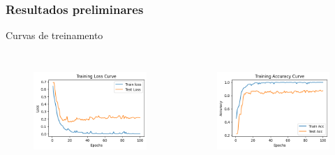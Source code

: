 \documentclass[aspectratio=169]{beamer}
\begin{document}
\begin{frame}
    \frametitle{Resultados preliminares}


    \centering
    Curvas de treinamento

    \begin{columns}



        \begin{figure}
            \centering
            \includegraphics[scale = 0.6]{img/lossbracol.png}
            \label{fig:enter-label}
        \end{figure}




        \begin{figure}
            \centering
            \includegraphics[scale = 0.6]{img/accbracol.png}
            \label{fig:enter-label}
        \end{figure}


    \end{columns}
\end{frame}
\end{document}
